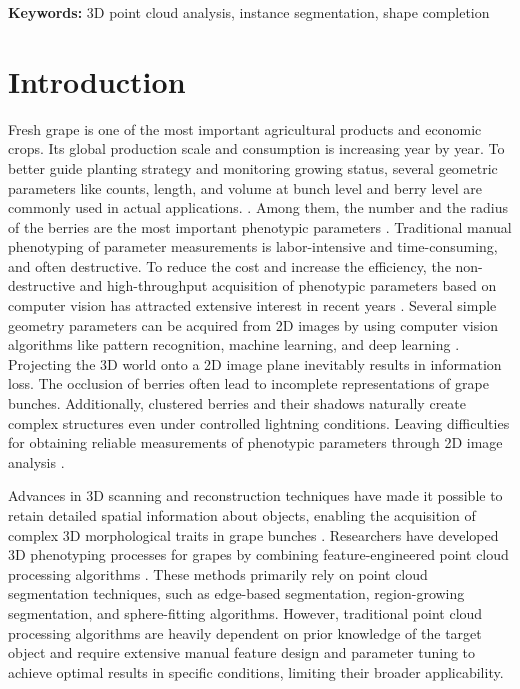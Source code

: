 \documentclass[12pt]{article}
\begin{document}
\textbf{Keywords:} 3D point cloud analysis, instance segmentation, shape completion

\doublespacing

\section{Introduction}
Fresh grape is one of the most important agricultural products and economic crops. 
Its global production scale and consumption is increasing year by year. 
To better guide planting strategy and monitoring growing status, several geometric parameters like counts, length, and volume at bunch level and berry level are commonly used in actual applications. \citep{luo_prediction_2024,raihen_prediction_2024,kamangir_largescale_2024,barbole_comparative_2023}. 
Among them, the number and the radius of the berries are the most important phenotypic parameters \citep{sneha_acrescale_2024}. 
Traditional manual phenotyping of parameter measurements is labor-intensive and time-consuming, and often destructive. 
To reduce the cost and increase the efficiency, the non-destructive and high-throughput acquisition of phenotypic parameters based on computer vision has attracted extensive interest in recent years \citep{li_review_2020}. 
Several simple geometry parameters can be acquired from 2D images by using computer vision algorithms like pattern recognition, machine learning, and deep learning \citep{zabawa_counting_2020}. 
Projecting the 3D world onto a 2D image plane inevitably results in information loss. 
The occlusion of berries often lead to incomplete representations of grape bunches. 
Additionally, clustered berries and their shadows naturally create complex structures even under controlled lightning conditions. 
Leaving difficulties for obtaining reliable measurements of phenotypic parameters through 2D image analysis \citep{fei_comprehensive_2022,xiang_multispace_2023}.

Advances in 3D scanning and reconstruction techniques have made it possible to retain detailed spatial information about objects, enabling the acquisition of complex 3D morphological traits in grape bunches \citep{jiang_3d_2019,ni_threedimensional_2021}. 
Researchers have developed 3D phenotyping processes for grapes by combining feature-engineered point cloud processing algorithms \citep{rose_automated_2016,rist_highprecision_2018}. 
These methods primarily rely on point cloud segmentation techniques, such as edge-based segmentation, region-growing segmentation, and sphere-fitting algorithms. 
However, traditional point cloud processing algorithms are heavily dependent on prior knowledge of the target object and require extensive manual feature design and parameter tuning to achieve optimal results in specific conditions, limiting their broader applicability.
\end{document}
